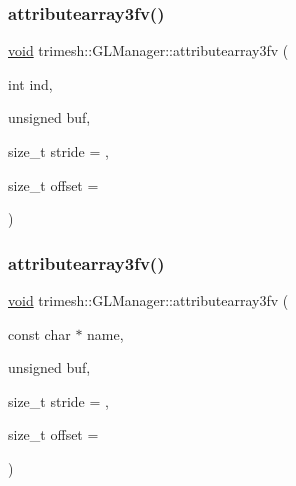 \subsubsection{\texorpdfstring{attributearray3fv()}{attributearray3fv()}\hspace{0.1cm}{\footnotesize\ttfamily [5/6]}}
{\footnotesize\ttfamily \hyperlink{namespacetrimesh_a784ddfd979e1c579bda795a8edfc3f43}{void} trimesh\+::\+G\+L\+Manager\+::attributearray3fv (\begin{DoxyParamCaption}\item[{int}]{ind,  }\item[{unsigned}]{buf,  }\item[{size\+\_\+t}]{stride = {},  }\item[{size\+\_\+t}]{offset = {} }\end{DoxyParamCaption})\hspace{0.3cm}{\ttfamily [inline]}}

\mbox{\label{classtrimesh_1_1GLManager_a88119baf304c1506a78eb4b34faadb35}} 
\subsubsection{\texorpdfstring{attributearray3fv()}{attributearray3fv()}\hspace{0.1cm}{\footnotesize\ttfamily [6/6]}}
{\footnotesize\ttfamily \hyperlink{namespacetrimesh_a784ddfd979e1c579bda795a8edfc3f43}{void} trimesh\+::\+G\+L\+Manager\+::attributearray3fv (\begin{DoxyParamCaption}\item[{const char $\ast$}]{name,  }\item[{unsigned}]{buf,  }\item[{size\+\_\+t}]{stride = {},  }\item[{size\+\_\+t}]{offset = {} }\end{DoxyParamCaption})\hspace{0.3cm}{\ttfamily [inline]}}

\mbox{\label{classtrimesh_1_1GLManager_a97cdf66eccf0f2b2d9103887ddb54ead}} 
